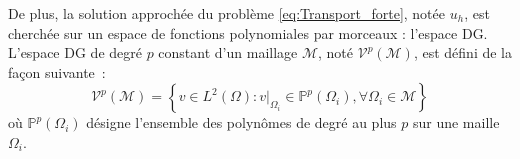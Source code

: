 \documentclass[11pt, a4paper, oneside]{report}
\newcommand{\restricdynamic}[2]{\left.#1\right\vert_{#2}}
\begin{document}
\begin{samepage}
De plus, la solution approchée du problème \eqref{eq:Transport_forte}, notée $u_h$, est cherchée sur un espace de fonctions polynomiales par morceaux : l'espace DG. \\
L'espace DG de degré $p$ constant d'un maillage $\mathcal{M}$, noté $\mathcal{V}^p(\mathcal{M})$, est défini de la façon suivante~:
\begin{equation}
    \mathcal{V}^p(\mathcal{M}) = \left \{ v \in L^2(\Omega) : \restricdynamic{v}{\Omega_i} \in \mathbb{P}^p(\Omega_i), \forall \Omega_i \in \mathcal{M} \right \}
\end{equation}
où $\mathbb{P}^p(\Omega_i)$ désigne l'ensemble des polynômes de degré au plus $p$ sur une maille $\Omega_i$.
\end{samepage}
\end{document}
